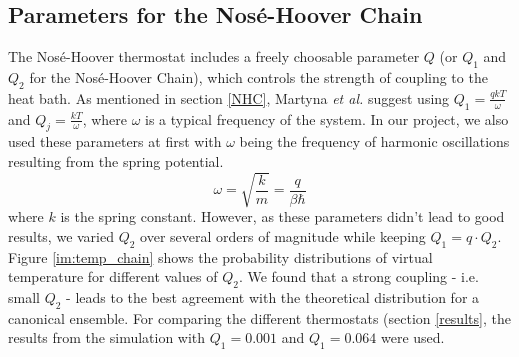 \subsection{Parameters for the Nosé-Hoover Chain}
The Nosé-Hoover thermostat includes a freely choosable parameter $Q$ (or $Q_1$ and $Q_2$ for the Nosé-Hoover Chain), which controls the strength of coupling to the heat bath. As mentioned in section \ref{NHC}, Martyna \textit{et al.} \cite{Martyna1992} suggest using $Q_1 = \frac{qkT}{\omega}$ and $Q_j = \frac{kT}{\omega}$, where $\omega$ is a typical frequency of the system. In our project, we also used these parameters at first with $\omega$ being the frequency of harmonic oscillations resulting from the spring potential.
\begin{equation}
\omega = \sqrt{\frac{k}{m}} = \frac{q}{\beta \hbar}
\end{equation} 
where $k$ is the spring constant. However, as these parameters didn't lead to good results, we varied $Q_2$ over several orders of magnitude while keeping $Q_1 = q\cdot Q_2$. Figure \ref{im:temp_chain} shows the probability distributions of virtual temperature for different values of $Q_2$. We found that a strong coupling - i.e. small $Q_2$ - leads to the best agreement with the theoretical distribution for a canonical ensemble. For comparing the different thermostats (section \ref{results}, the results from the simulation with $Q_1 = 0.001$ and $Q_1 = 0.064$ were used. 


